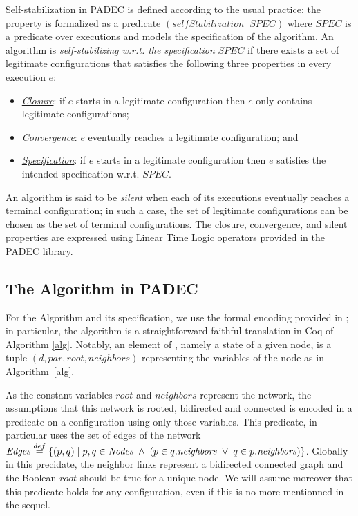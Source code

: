 Self-stabilization in PADEC is defined according to the usual
practice: the property is formalized as a predicate
$(\mathit{selfStabilization} \;\; \mathit{SPEC})$
where $\mathit{SPEC}$ is a predicate over executions
and models the specification of the algorithm.  An algorithm
is \emph{self-stabilizing w.r.t. the specification}
$\mathit{SPEC}$ if there exists a set of legitimate configurations
that satisfies the following three properties in every
execution $e$:
\begin{itemize}
\item \underline{\emph{Closure}}:
  if $e$ starts in a legitimate configuration then $e$ only contains
  legitimate configurations;
\item \underline{\emph{Convergence}}:
  $e$ eventually reaches a legitimate configuration; and
\item \underline{\emph{Specification}}:
  if $e$ starts in a legitimate configuration then $e$ satisfies the
  intended specification w.r.t. $\mathit{SPEC}$.
\end{itemize}
An algorithm is said to be \emph{silent} when each of its executions
eventually reaches a terminal configuration; in such a case, the set
of legitimate configurations can be chosen as the set of terminal
configurations.  The closure, convergence, and silent properties are
expressed using Linear Time Logic operators provided in the PADEC
library.

\subsection*{The \BFS Algorithm in PADEC}

For the \BFS Algorithm and its specification, we use the formal encoding
provided in \cite{AltisenCD23}; in particular, the algorithm is a
straightforward faithful translation in Coq of
Algorithm \ref{alg}. Notably, an element of \States,
namely a state of a given node, is a tuple
$(d, \mathit{par}, \mathit{root}, \mathit{neighbors})$ representing
the variables of the node as in Algorithm~\ref{alg}.

As the constant variables $\mathit{root}$ and $\mathit{neighbors}$
represent the network, the assumptions that this network is rooted,
bidirected and connected is encoded in a predicate on a configuration
using only those variables. This predicate, in particular uses the set
of edges of the network $\mathit{Edges} \stackrel{def}= \{ (p, q) \;|\; p,
q \in \mathit{Nodes} \;\wedge\; (p \in q.\mathit{neighbors} \;\vee\; q \in
p.\mathit{neighbors}) \}$. Globally in this precidate, the neighbor
links represent a bidirected connected graph and the Boolean
$\mathit{root}$ should be true for a unique node.
We will assume moreover that this predicate holds for any
configuration, even if this is no more mentionned in the sequel.

